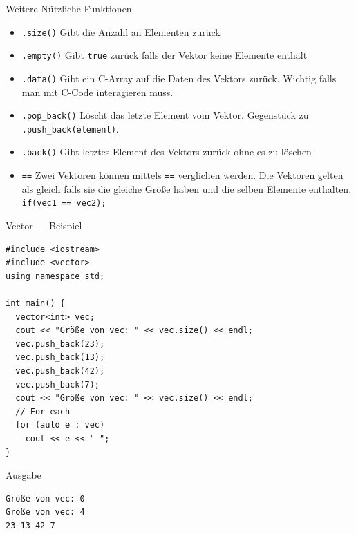 \documentclass[presentation]{beamer}
\begin{document}
\begin{frame}[label={sec:orgb91970c},fragile]{Weitere Nützliche Funktionen}
 \begin{itemize}
\item {\color{solarizedYellow}\verb!.size()!} Gibt die Anzahl an Elementen zurück
\item {\color{solarizedYellow}\verb!.empty()!} Gibt {\color{solarizedYellow}\verb!true!} zurück falls der Vektor keine Elemente enthält
\item {\color{solarizedYellow}\verb!.data()!} Gibt ein C-Array auf die Daten des Vektors zurück. Wichtig
falls man mit C-Code interagieren muss.
\item {\color{solarizedYellow}\verb!.pop_back()!} Löscht das letzte Element vom Vektor. Gegenstück zu
{\color{solarizedYellow}\verb!.push_back(element)!}.
\item {\color{solarizedYellow}\verb!.back()!} Gibt letztes Element des Vektors zurück ohne es zu löschen
\item {\color{solarizedYellow}\verb!==!} Zwei Vektoren können mittels {\color{solarizedYellow}\verb!==!} verglichen werden. Die
Vektoren gelten als gleich falls sie die gleiche Größe haben und die
selben Elemente enthalten. {\color{solarizedYellow}\verb!if(vec1 == vec2);!}
\end{itemize}
\end{frame}
\begin{frame}[label={sec:org6dbce1a},fragile]{Vector --- Beispiel}
 \begin{verbatim}
#include <iostream>
#include <vector>
using namespace std;

int main() {
  vector<int> vec;
  cout << "Größe von vec: " << vec.size() << endl;
  vec.push_back(23);
  vec.push_back(13);
  vec.push_back(42);
  vec.push_back(7);
  cout << "Größe von vec: " << vec.size() << endl;
  // For-each 
  for (auto e : vec)
    cout << e << " ";
}
\end{verbatim}
\begin{block}{Ausgabe}
\begin{verbatim}
Größe von vec: 0
Größe von vec: 4
23 13 42 7 
\end{verbatim}
\end{block}
\end{frame}
\end{document}
